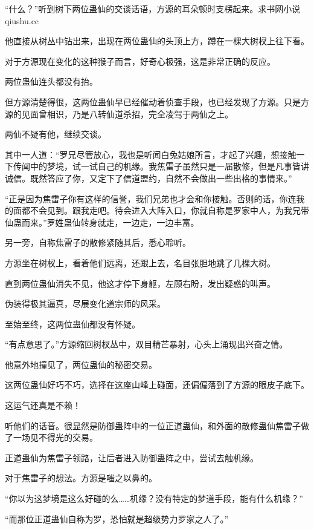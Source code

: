 
\begin{this_body}

“什么？”听到树下两位蛊仙的交谈话语，方源的耳朵顿时支楞起来。求书网小说qiushu.cc

他直接从树丛中钻出来，出现在两位蛊仙的头顶上方，蹲在一棵大树杈上往下看。

对于方源现在变化的这种猴子而言，好奇心极强，这是非常正确的反应。

两位蛊仙连头都没有抬。

但方源清楚得很，这两位蛊仙早已经催动着侦查手段，也已经发现了方源。只是方源的见面曾相识，乃是八转仙道杀招，完全凌驾于两仙之上。

两仙不疑有他，继续交谈。

其中一人道：“罗兄尽管放心，我也是听闻白兔姑娘所言，才起了兴趣，想接触一下传闻中的梦境，试一试自己的机缘。我焦雷子虽然只是一届散修，但是凡事皆讲诚信。既然答应了你，又定下了信道盟约，自然不会做出一些出格的事情来。”

“正是因为焦雷子你有这样的信誉，我们兄弟也才会和你接触。否则的话，你连我的面都不会见到。跟我走吧。待会进入大阵入口，你就自称是罗家中人，为我兄带仙蛊而来。”罗姓蛊仙转身就走，一边走，一边丰富。

另一旁，自称焦雷子的散修紧随其后，悉心聆听。

方源坐在树杈上，看着他们远离，还跟上去，名目张胆地跳了几棵大树。

直到两位蛊仙消失不见，他这才停下身躯，左顾右盼，发出疑惑的叫声。

伪装得极其逼真，尽展变化道宗师的风采。

至始至终，这两位蛊仙都没有怀疑。

“有点意思了。”方源缩回树杈丛中，双目精芒暴射，心头上涌现出兴奋之情。

他意外地撞见了，两位蛊仙的秘密交易。

这两位蛊仙好巧不巧，选择在这座山峰上碰面，还偏偏落到了方源的眼皮子底下。

这运气还真是不赖！

听他们的话音。很显然是防御蛊阵中的一位正道蛊仙，和外面的散修蛊仙焦雷子做了一场见不得光的交易。

正道蛊仙为焦雷子领路，让后者进入防御蛊阵之中，尝试去触机缘。

对于焦雷子的想法。方源是嗤之以鼻的。

“你以为这梦境是这么好碰的么……机缘？没有特定的梦道手段，能有什么机缘？”

“而那位正道蛊仙自称为罗，恐怕就是超级势力罗家之人了。”


\end{this_body}
